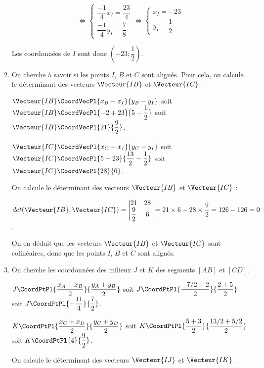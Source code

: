 \documentclass[a4paper]{article}
\begin{document}
\begin{exercice}{}{}
\begin{enumerate}
      $$\iff \begin{cases}
        \dfrac{-1}{4}x_I=\dfrac{23}{4}\\
        \dfrac{-1}{4}y_I=\dfrac{7}{8}
      \end{cases} \iff \begin{cases}
        x_I=-23\\
        y_I=\dfrac{1}{2}
      \end{cases}$$

      Les coordonnées de $I$ sont donc $(-23;\dfrac{1}{2})$.



      \item On cherche à savoir si les points $I$, $B$ et $C$ sont alignés. Pour cela, on calcule le déterminant des vecteurs $\Vecteur{IB}$ et $\Vecteur{IC}$.
      
      $\Vecteur{IB}\CoordVecPl{x_B-x_I}{y_B-y_I}$ soit $\Vecteur{IB}\CoordVecPl{-2+23}{5-\dfrac{1}{2}}$ soit $\Vecteur{IB}\CoordVecPl{21}{\dfrac{9}{2}}$.

      $\Vecteur{IC}\CoordVecPl{x_C-x_I}{y_C-y_I}$ soit $\Vecteur{IC}\CoordVecPl{5+23}{\dfrac{13}{2}-\dfrac{1}{2}}$ soit $\Vecteur{IC}\CoordVecPl{28}{6}$.

      On calcule le déterminant des vecteurs $\Vecteur{IB}$ et $\Vecteur{IC}$ :

      $det(\Vecteur{IB},\Vecteur{IC})=\begin{vmatrix}
        21 & 28\\
        \dfrac{9}{2} & 6
      \end{vmatrix} = 21 \times 6 - 28 \times \dfrac{9}{2} = 126 - 126 = 0$.

      On en déduit que les vecteurs $\Vecteur{IB}$ et $\Vecteur{IC}$ sont colinéaires, donc que les points $I$, $B$ et $C$ sont alignés.

      \item On cherche les coordonnées des milieux $J$ et $K$ des segments $[AB]$ et $[CD]$.
      
      $J\CoordPtPl{\dfrac{x_A+x_B}{2}}{\dfrac{y_A+y_B}{2}}$ soit $J\CoordPtPl{\dfrac{-7/2-2}{2}}{\dfrac{2+5}{2}}$ soit $J\CoordPtPl{-\dfrac{11}{4}}{\dfrac{7}{2}}$.

      $K\CoordPtPl{\dfrac{x_C+x_D}{2}}{\dfrac{y_C+y_D}{2}}$ soit $K\CoordPtPl{\dfrac{5+3}{2}}{\dfrac{13/2+5/2}{2}}$ soit $K\CoordPtPl{4}{\dfrac{9}{2}}$.

      On calcule le déterminant des vecteurs $\Vecteur{IJ}$ et $\Vecteur{IK}$.


\end{enumerate}
\end{exercice}
\end{document}

